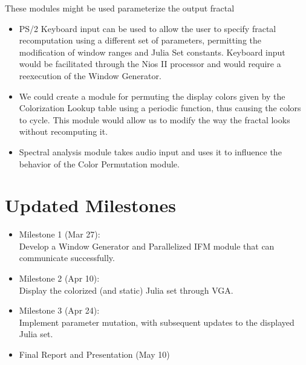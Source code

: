 \documentclass{article}
\begin{document}
These modules might be used parameterize the output fractal

\begin{itemize}
\item PS/2 Keyboard input can be used to allow the user to specify
  fractal recomputation using a different set of parameters,
  permitting the modification of window ranges and Julia Set
  constants. Keyboard input would be facilitated through the Nios II
  processor and would require a reexecution of the Window Generator.
\item We could create a module for permuting the display colors given
  by the Colorization Lookup table using a periodic function, thus
  causing the colors to cycle. This module would allow us to modify
  the way the fractal looks without recomputing it.
\item Spectral analysis module takes audio input and uses it to
  influence the behavior of the Color Permutation module.
\end{itemize}


\section{Updated Milestones}

\begin{itemize}
\item Milestone 1 (Mar 27): \\
  Develop a Window Generator and
  Parallelized IFM module that can communicate successfully.
\item Milestone 2 (Apr 10): \\
  Display the colorized (and static) Julia set through VGA.
\item Milestone 3 (Apr 24): \\ 
  Implement parameter mutation, with subsequent updates to the
  displayed Julia set.
\item Final Report and Presentation (May 10)
\end{itemize}
\end{document}
